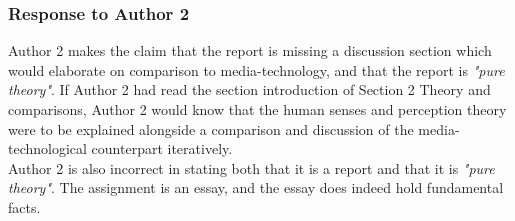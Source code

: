 \documentclass{article}
\begin{document}
\subsubsection{Response to Author 2}
Author 2 makes the claim that the report is missing a discussion section which would elaborate on comparison to media-technology, and that the report is \textit{"pure theory"}. If Author 2 had read the section introduction of Section 2 Theory and comparisons, Author 2 would know that the human senses and perception theory were to be explained alongside a comparison and discussion of the media-technological counterpart iteratively.\\Author 2 is also incorrect in stating both that it is a report and that it is \textit{"pure theory"}. The assignment is an essay, and the essay does indeed hold fundamental facts.\\
\end{document}
